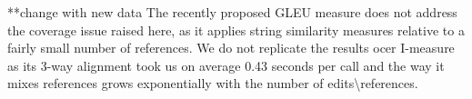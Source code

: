 \documentclass[a4paper, 11pt]{article}
\begin{document}
%
%

**change with new data
The recently proposed GLEU \cite{napoles2015ground} measure does not address
the coverage issue raised here, as it applies string similarity measures relative to a fairly small
number of references. We do not replicate the results ocer {\sc I-measure} \cite{felice2015towards} as its 3-way alignment took us on average 0.43 seconds per call and the way it mixes references grows exponentially with the number of edits\textbackslash{}references.

\end{document}
